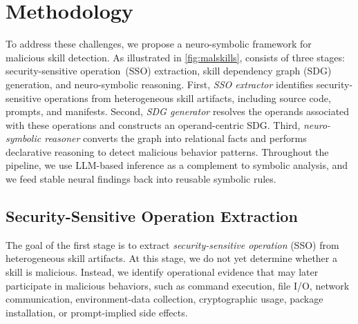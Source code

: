 \section{Methodology}

To address these challenges, we propose a neuro-symbolic framework for malicious skill detection. As illustrated in \autoref{fig:malskills}, \toolname consists of three stages: security-sensitive operation~(SSO) extraction, skill dependency graph (SDG) generation, and neuro-symbolic reasoning. First, \emph{SSO extractor} identifies security-sensitive operations from heterogeneous skill artifacts, including source code, prompts, and manifests. Second, \emph{SDG generator} resolves the operands associated with these operations and constructs an operand-centric SDG. Third, \emph{neuro-symbolic reasoner} converts the graph into relational facts and performs declarative reasoning to detect malicious behavior patterns. Throughout the pipeline, we use LLM-based inference as a complement to symbolic analysis, and we feed stable neural findings back into reusable symbolic rules.

\subsection{Security-Sensitive Operation Extraction}

The goal of the first stage is to extract \emph{security-sensitive operation} (SSO) from heterogeneous skill artifacts. At this stage, we do not yet determine whether a skill is malicious. Instead, we identify operational evidence that may later participate in malicious behaviors, such as command execution, file I/O, network communication, environment-data collection, cryptographic usage, package installation, or prompt-implied side effects.

